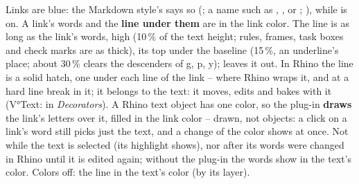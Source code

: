 Links are blue: the Markdown style's  says so (; a name such as ,
,  or ; ), while  is on. A link's
words and the \textbf{line under them} are in the link color. The line is as long as the link's words,
 high (10\,\% of the text height; rules, frames, task boxes and check marks are as thick), its top  under the
baseline (15\,\%, an underline's place; about 30\,\% clears the descenders of g, p, y); 
leaves it out. In Rhino the line is
a solid hatch, one under each line of the link -- where Rhino wraps it, and at a hard line break in it; it belongs to the text: it moves, edits and bakes with it (V°Text: in \emph{Decorators}). A
Rhino text object has one color, so the plug-in \textbf{draws} the link's letters over it, filled in the link color --
drawn, not objects: a click on a link's word still picks just the text, and a change of the color shows at once. Not
while the text is selected (its highlight shows), nor after its words were changed in Rhino until it is edited again;
without the plug-in the words show in the text's color. Colors off: the line in the text's color (by its layer).
